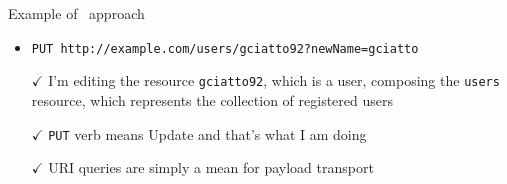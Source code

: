 \begin{frame}[allowframebreaks]
	\begin{exampleblock}{Example of \restful\ approach}
		\begin{itemize}
			\item \texttt{PUT http://example.com/users/gciatto92?newName=gciatto}
			\item[]
			\item[$\checkmark$] I'm editing the resource \texttt{gciatto92}, which is a user, composing the \texttt{users} resource, which represents the collection of registered users 
			\item[$\checkmark$] \texttt{PUT} verb means Update and that's what I am doing
			\item[$\checkmark$] URI queries are simply a mean for payload transport
		\end{itemize}
	\end{exampleblock}	
\end{frame}

